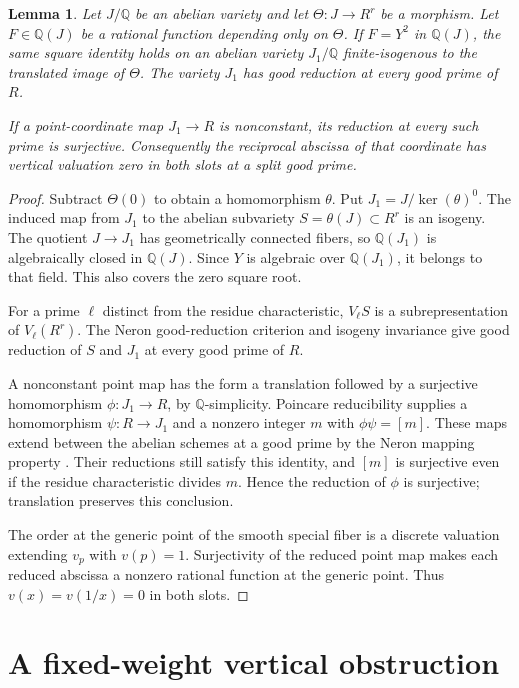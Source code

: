 \documentclass[11pt,a4paper]{article}
\newtheorem{lemma}[theorem]{Lemma}
\newcommand{\Q}{\mathbb Q}
\begin{document}
\begin{lemma}\label{lem:quotient}
Let $J/\Q$ be an abelian variety and let
$\Theta:J\to R^r$ be a morphism. Let $F\in\Q(J)$ be a
rational function depending only on $\Theta$. If $F=Y^2$ in
$\Q(J)$, the same square identity holds on an abelian variety
$J_1/\Q$ finite-isogenous to the translated image of $\Theta$.
The variety $J_1$ has good reduction at every good prime of $R$.

If a point-coordinate map $J_1\to R$ is nonconstant, its
reduction at every such prime is surjective. Consequently the
reciprocal abscissa of that coordinate has vertical valuation zero
in both slots at a split good prime.
\end{lemma}
\begin{proof}
Subtract $\Theta(0)$ to obtain a homomorphism $\theta$.
Put $J_1=J/\ker(\theta)^0$. The induced map from $J_1$ to
the abelian subvariety $S=\theta(J)\subset R^r$ is an isogeny.
The quotient $J\to J_1$ has geometrically connected fibers,
so $\Q(J_1)$ is algebraically closed in $\Q(J)$. Since $Y$
is algebraic over $\Q(J_1)$, it belongs to that field. This
also covers the zero square root.

For a prime $\ell$ distinct from the residue characteristic,
$V_\ell S$ is a subrepresentation of $V_\ell(R^r)$.
The Neron good-reduction criterion and isogeny invariance
\cite[Chapter IV, Theorem 3.5 and Corollary 3.6]{Milne} give
good reduction of $S$ and $J_1$ at every good prime of $R$.

A nonconstant point map has the form a translation followed by
a surjective homomorphism $\phi:J_1\to R$, by $\Q$-simplicity.
Poincare reducibility \cite[Chapter I, Proposition 10.1]{Milne}
supplies a homomorphism
$\psi:R\to J_1$ and a nonzero integer $m$ with
$\phi\psi=[m]$. These maps extend between the abelian schemes
at a good prime by the Neron mapping property
\cite[Chapter I, Remark 17.2]{Milne}.
Their reductions still satisfy this identity,
and $[m]$ is surjective even if the residue characteristic divides
$m$. Hence the reduction of $\phi$ is surjective; translation
preserves this conclusion.

The order at the generic point of the smooth special fiber is
a discrete valuation extending $v_p$ with $v(p)=1$.
Surjectivity of the reduced point map makes each reduced
abscissa a nonzero rational function at the generic point.
Thus $v(x)=v(1/x)=0$ in both slots.
\end{proof}

\section{A fixed-weight vertical obstruction}
\end{document}
